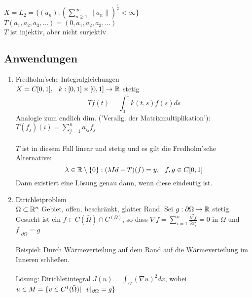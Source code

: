 \begin{beispiel}
$X = L_{2} = \{ (a_{n}): \left( \sum_{n \geq 1}^{\infty} \| a_{n} \| \right)^{\frac{1}{2}} < \infty \}$	\\
$T ( a_{1}, a_{2}, a_{3}, ...) = ( 0, a_{1}, a_{2}, a_{3}, ...)$ \\

$T$ ist injektiv, aber nicht surjektiv
\end{beispiel}


\subsection*{Anwendungen}


\begin{enumerate}
	\item Fredholm'sche Integralgleichungen  \\
	$X = C[0, 1], \hspace{0.25cm} k: [0, 1] \times [0, 1] \rightarrow \mathbb{R}$ stetig \\
	\[ Tf(t) = \int_{0}^{1} k(t, s) f(s) ds \]
	Analogie zum endlich dim. ('Verallg. der Matrixmultiplikation'):  $ T(f_{j})(i) = \sum_{j = 1}^{n} a_{ij}f_{j}$ \\ \\
 	$T$ ist in diesem Fall linear und stetig und es gilt die Fredholm'sche Alternative:
	\[ \lambda \in \mathbb{R} \setminus \{0\}: (\lambda Id - T)(f) = y, \hspace{0.25cm} f,g \in C[0, 1] \]
	Dann existiert eine Lösung genau dann, wenn diese eindeutig ist. \\
	\item Dirichletproblem \\
	$\Omega \subset \mathbb{R}^n$ Gebiet, offen, beschränkt, glatter Rand. Sei $g: \partial \Omega \rightarrow \mathbb{R}$ stetig \\ 
	Gesucht ist ein $f \in C(\bar \Omega) \cap  C^(\Omega)$, so dass $\nabla f = \sum_{i = 1}^{n} \frac{\partial^{2} f}{\partial x_{i}^2} = 0$ in $\Omega$ und $f|_{\partial \Omega}= g$ \\ \\
	Beispiel: Durch Wärmeverteilung auf dem Rand auf die Wärmeverteilung im Inneren schlie{\ss}en. \\ \\
	Lösung: Dirichletintegral $J(u) = \int_{\Omega} (\nabla u )^{2} dx$, wobei $ u \in M = \{ v \in C^{1}(\bar \Omega) | \hspace{0.25cm} v|_{\partial \Omega} = g \}$ \\

\end{enumerate}
